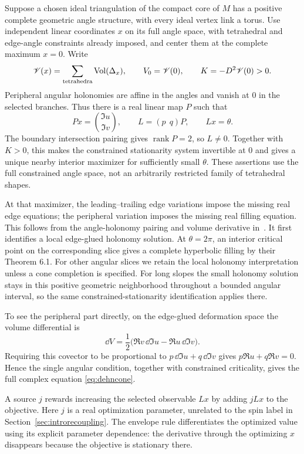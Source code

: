 Suppose a chosen ideal triangulation of the compact core of $M$ has
a positive complete geometric angle structure, with every ideal vertex
link a torus. Use independent linear coordinates $x$ on its full angle space,
with tetrahedral and edge-angle constraints already imposed, and center
them at the complete maximum $x=0$. Write
\[
 \mathscr V(x)=\sum_{\text{tetrahedra}}\operatorname{Vol}(\Delta_x),\qquad
 V_0=\mathscr V(0),\qquad K=-D^2\mathscr V(0)>0.
\]
Peripheral angular holonomies are affine in the angles and vanish
at $0$ in the selected branches. Thus there is a real linear map $P$
such that
\[
 Px=\binom{\Im u}{\Im v},\qquad
 L=(p\ \ q)P,\qquad Lx=\theta.
\]
The boundary intersection pairing gives $\operatorname{rank}P=2$,
so $L\ne0$. Together with $K>0$, this makes the constrained
stationarity system invertible at $0$ and gives a unique nearby
interior maximizer for sufficiently small $\theta$. These assertions
use the full constrained angle space, not an arbitrarily restricted
family of tetrahedral shapes.

At that maximizer, the leading--trailing edge variations impose the
missing real edge equations; the peripheral variation imposes the
missing real filling equation. This follows from the angle-holonomy
pairing and volume derivative in~\cite[Lemma 4.4, Proposition 4.6 and
Proposition 5.4]{FuterGueritaud}. It first identifies a local edge-glued
holonomy solution. At $\theta=2\pi$, an interior critical point on
the corresponding slice gives a complete hyperbolic filling by their
Theorem 6.1. For other angular slices we retain the local holonomy
interpretation unless a cone completion is specified.
For long slopes the small holonomy solution stays in this positive
geometric neighborhood throughout a bounded angular interval, so the
same constrained-stationarity identification applies there.

To see the peripheral part directly, on the edge-glued deformation
space the volume differential is
\begin{equation}
 \dd V=\frac12\bigl(\Re v\,\dd\Im u
                         -\Re u\,\dd\Im v\bigr).
 \label{eq:dehnvolumedifferential}
\end{equation}
Requiring this covector to be proportional to
$p\,\dd\Im u+q\,\dd\Im v$ gives
$p\Re u+q\Re v=0$. Hence the single angular condition, together
with constrained criticality, gives the full complex equation
\eqref{eq:dehncone}.

A source $j$ rewards increasing the selected observable $Lx$ by
adding $jLx$ to the objective. Here $j$ is a real optimization
parameter, unrelated to the spin label in Section~\ref{sec:introrecoupling}.
The envelope rule differentiates the optimized value using its
explicit parameter dependence: the derivative through the
optimizing $x$ disappears because the objective is stationary there.

